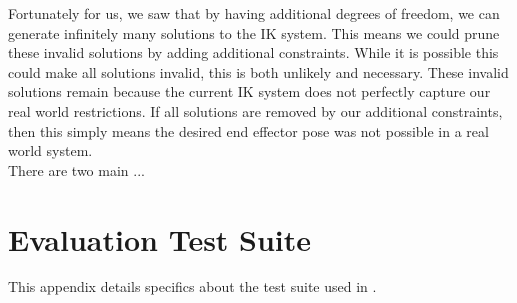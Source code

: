 Fortunately for us, we saw that by having additional degrees of freedom, we can generate infinitely many solutions to the IK system. This means we could prune these invalid solutions by adding additional constraints. While it is possible this could make all solutions invalid, this is both unlikely and necessary. These invalid solutions remain because the current IK system does not perfectly capture our real world restrictions. If all solutions are removed by our additional constraints, then this simply means the desired end effector pose was not possible in a real world system.\\

There are two main ...



\chapter{Evaluation Test Suite}
\label{apx:test-suite}

This appendix details specifics about the test suite used in .\\

